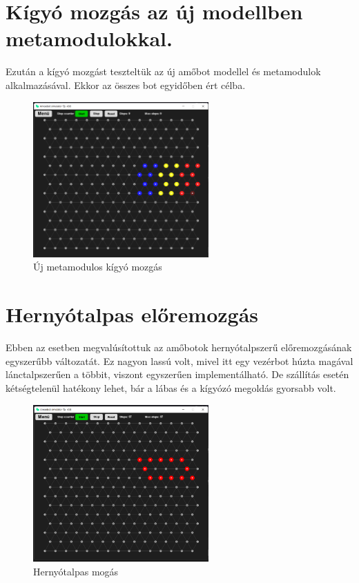 \documentclass[	
  noindent
]{elteikthesis}[2024/04/26]
\begin{document}
  \section{Kígyó mozgás az új modellben metamodulokkal.}
    Ezután a kígyó mozgást teszteltük az új amőbot modellel és metamodulok alkalmazásával. Ekkor az összes bot egyidőben ért célba.

    \begin{figure}[H]
      \centering
      \includegraphics[width=0.6\textwidth]{images/mesurements/02_blokk_snake.png}
      \caption{Új metamodulos kígyó mozgás}
      \label{fig:02_blokk_snake}
    \end{figure}
  
  \section{Hernyótalpas előremozgás}
    Ebben az esetben megvalúsítottuk az amőbotok hernyótalpszerű előremozgásának egyszerűbb változatát. Ez nagyon lassú volt, mivel itt egy vezérbot húzta magával lánctalpszerűen a többit, viszont egyszerűen implementálható. De szállítás esetén kétségtelenül hatékony lehet, bár a lábas és a kígyózó megoldás gyorsabb volt.

    \begin{figure}[H]
      \centering
      \includegraphics[width=0.6\textwidth]{images/mesurements/03_rawler.png}
      \caption{Hernyótalpas mogás}
      \label{fig:03_rawler}
    \end{figure}
    
\end{document}
